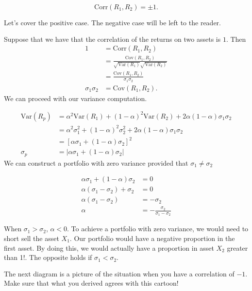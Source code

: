 \documentclass{ximera}
\begin{document}
\begin{equation*}
\text{Corr}(R_1,R_2)=\pm 1.
\end{equation*}

Let's cover the positive case. The negative case will be left to the reader.

\begin{example}
Suppose that we have that the correlation of the returns on two assets is $1$. Then
	\begin{align*}
	1				&=\text{Corr}(R_1, R_2)\\
				 	&=\frac{\text{Cov}(R_1, R_2)}{\sqrt{\text{Var}(R_1)}{\sqrt{\text{Var}(R_2)}}}\\
					&=\frac{\text{Cov}(R_1, R_2)}{\sigma_1\sigma_2}\\
	\sigma_1\sigma_2 		&=\text{Cov}(R_1, R_2).
	\end{align*}
We can proceed with our variance computation.

	\begin{align*}
	\text{Var}(R_p) 	&=\alpha^2\text{Var}(R_1)+(1-\alpha)^2\text{Var}(R_2)+2\alpha(1-\alpha)\sigma_1\sigma_2\\
				&=\alpha^2\sigma_1^2+(1-\alpha)^2\sigma_2^2+2\alpha(1-\alpha)\sigma_1\sigma_2\\
				&=[\alpha\sigma_1+(1-\alpha)\sigma_2]^2\\
	\sigma_p 		&=|\alpha\sigma_1+(1-\alpha)\sigma_2|
	\end{align*}
We can construct a portfolio with zero variance provided that $\sigma_1\not=\sigma_2$

	\begin{align*}
 	\alpha\sigma_1+(1-\alpha)\sigma_2 	&=0\\
	\alpha(\sigma_1-\sigma_2)+\sigma_2 	&=0\\
	\alpha(\sigma_1-\sigma_2) 		&=-\sigma_2\\
	\alpha						&=-\frac{\sigma_2}{\sigma_1-\sigma_2}
	\end{align*}

When $\sigma_1>\sigma_2$, $\alpha<0$. To achieve a portfolio with zero variance, we would need to short sell the asset $X_1$. Our portfolio would have a negative proportion in the first asset. By doing this, we would actually have a proportion in asset $X_2$ greater than 1!. The opposite holds if $\sigma_1<\sigma_2$. 
\end{example}

The next diagram is a picture of the situation when you have a correlation of $-1$. Make sure that what you derived agrees with this cartoon!
\end{document}

